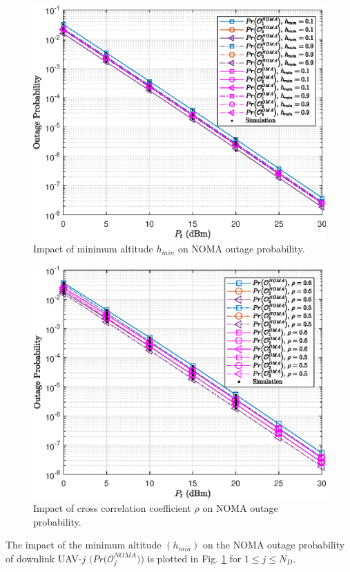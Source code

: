 \begin{figure} [t] 
\centering
\vspace{0.5cm}
\includegraphics [width=0.45\columnwidth]{chap8_fig/outage_probability_impact_altitude.eps} 
\caption{Impact of minimum altitude $h_{min}$ on NOMA outage probability.}
\label{fig:NOMA_bivariate_Rician_Shadowed_outage_probability_impact_altitude}
\end{figure}

\begin{figure} [t] 
\centering
\vspace{0.5cm}
\includegraphics [width=0.45\columnwidth]{chap8_fig/outage_probability_impact_rho.eps} 
\caption{Impact of cross correlation coefficient $\rho$ on NOMA outage probability.}
\label{fig:NOMA_bivariate_Rician_Shadowed_outage_probability_impact_rho}
\end{figure}

The impact of the minimum altitude $(h_{min})$ on the NOMA outage probability of downlink UAV-$j$ $\big(Pr\big(\mathcal{O}_{j}^{NOMA}\big)\big)$ is plotted in Fig. \ref{fig:NOMA_bivariate_Rician_Shadowed_outage_probability_impact_altitude} for $1 \leq j \leq N_D$. 

